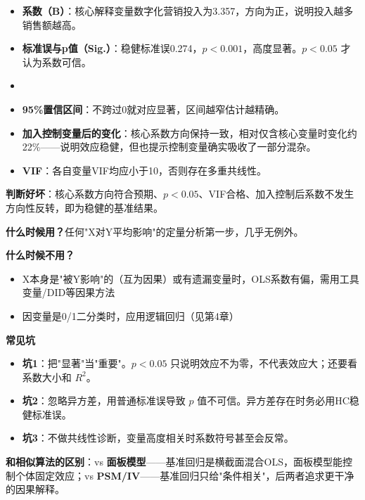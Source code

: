 \begin{algoresult}
\begin{itemize}
    \item \textbf{系数（B）}：核心解释变量数字化营销投入为3.357，方向为正，说明投入越多销售额越高。
    \item \textbf{标准误与p值（Sig.）}：稳健标准误0.274，$p<0.001$，高度显著。$p<0.05$ 才认为系数可信。
    \item \item \textbf{95\%置信区间}：不跨过0就对应显著，区间越窄估计越精确。
    \item \textbf{加入控制变量后的变化}：核心系数方向保持一致，相对仅含核心变量时变化约22\%——说明效应稳健，但也提示控制变量确实吸收了一部分混杂。
    \item \textbf{VIF}：各自变量VIF均应小于10，否则存在多重共线性。
\end{itemize}

\textbf{判断好坏}：核心系数方向符合预期、$p<0.05$、VIF合格、加入控制后系数不发生方向性反转，即为稳健的基准结果。
\end{algoresult}

\begin{algonotes}
\textbf{什么时候用？}任何"X对Y平均影响"的定量分析第一步，几乎无例外。

\textbf{什么时候不用？}
\begin{itemize}
    \item X本身是"被Y影响"的（互为因果）或有遗漏变量时，OLS系数有偏，需用工具变量/DID等因果方法
    \item 因变量是0/1二分类时，应用逻辑回归（见第4章）
\end{itemize}

\textbf{常见坑}
\begin{itemize}
    \item \textbf{坑1}：把"显著"当"重要"。$p<0.05$ 只说明效应不为零，不代表效应大；还要看系数大小和 $R^2$。
    \item \textbf{坑2}：忽略异方差，用普通标准误导致 $p$ 值不可信。异方差存在时务必用HC稳健标准误。
    \item \textbf{坑3}：不做共线性诊断，变量高度相关时系数符号甚至会反常。
\end{itemize}

\textbf{和相似算法的区别}：vs \textbf{面板模型}——基准回归是横截面混合OLS，面板模型能控制个体固定效应；vs \textbf{PSM/IV}——基准回归只给"条件相关"，后两者追求更干净的因果解释。
\end{algonotes}



